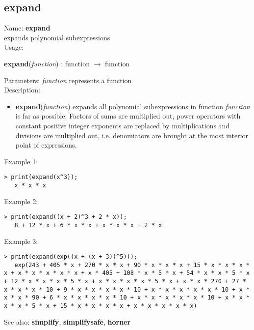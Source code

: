 \subsection{ expand }
\noindent Name: \textbf{expand}\\
expands polynomial subexpressions\\

\noindent Usage: 
\begin{center}
\textbf{expand}(\emph{function}) : \textsf{function} $\rightarrow$ \textsf{function}\\
\end{center}
Parameters: 
\emph{function} represents a function\\

\noindent Description: \begin{itemize}

\item \textbf{expand}(\emph{function}) expands all polynomial subexpressions in function
   \emph{function} is far as possible. Factors of sums are multiplied out,
   power operators with constant positive integer exponents are replaced
   by multiplications and divisions are multiplied out, i.e. denomiators
   are brought at the most interior point of expressions.
\end{itemize}
\noindent Example 1: 
\begin{center}\begin{minipage}{14.8cm}\begin{Verbatim}[frame=single]
   > print(expand(x^3));
   x * x * x
\end{Verbatim}
\end{minipage}\end{center}
\noindent Example 2: 
\begin{center}\begin{minipage}{14.8cm}\begin{Verbatim}[frame=single]
   > print(expand((x + 2)^3 + 2 * x));
   8 + 12 * x + 6 * x * x + x * x * x + 2 * x
\end{Verbatim}
\end{minipage}\end{center}
\noindent Example 3: 
\begin{center}\begin{minipage}{14.8cm}\begin{Verbatim}[frame=single]
   > print(expand(exp((x + (x + 3))^5)));
   exp(243 + 405 * x + 270 * x * x + 90 * x * x * x + 15 * x * x * x * x + x * x * x * x * x + x * 405 + 108 * x * 5 * x + 54 * x * x * 5 * x + 12 * x * x * x * 5 * x + x * x * x * x * 5 * x + x * x * 270 + 27 * x * x * x * 10 + 9 * x * x * x * x * 10 + x * x * x * x * x * 10 + x * x * x * 90 + 6 * x * x * x * x * 10 + x * x * x * x * x * 10 + x * x * x * x * 5 * x + 15 * x * x * x * x + x * x * x * x * x)
\end{Verbatim}
\end{minipage}\end{center}
See also: \textbf{simplify}, \textbf{simplifysafe}, \textbf{horner}
